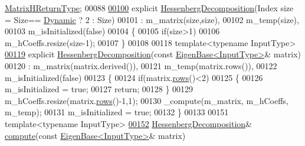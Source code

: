 \begin{DoxyCode}
       \hyperlink{group___eigenvalues___module_struct_eigen_1_1internal_1_1_hessenberg_decomposition_matrix_h_return_type}{MatrixHReturnType};
00088 
\hyperlink{group___eigenvalues___module_aee1724cb6418ede1a8b9045036a5a319}{00100}     \textcolor{keyword}{explicit} \hyperlink{group___eigenvalues___module_aee1724cb6418ede1a8b9045036a5a319}{HessenbergDecomposition}(Index size = Size==
      \hyperlink{namespace_eigen_ad81fa7195215a0ce30017dfac309f0b2}{Dynamic} ? 2 : Size)
00101       : m\_matrix(size,size),
00102         m\_temp(size),
00103         m\_isInitialized(false)
00104     \{
00105       \textcolor{keywordflow}{if}(size>1)
00106         m\_hCoeffs.resize(size-1);
00107     \}
00108 
00118     \textcolor{keyword}{template}<\textcolor{keyword}{typename} InputType>
\hyperlink{group___eigenvalues___module_acd22602a3e3e5a02f79990ba1e445dc9}{00119}     \textcolor{keyword}{explicit} \hyperlink{group___eigenvalues___module_acd22602a3e3e5a02f79990ba1e445dc9}{HessenbergDecomposition}(\textcolor{keyword}{const} 
      \hyperlink{group___core___module_struct_eigen_1_1_eigen_base}{EigenBase<InputType>}& matrix)
00120       : m\_matrix(matrix.derived()),
00121         m\_temp(matrix.rows()),
00122         m\_isInitialized(false)
00123     \{
00124       \textcolor{keywordflow}{if}(matrix.\hyperlink{group___core___module_a8141320ba8df384426c298b32b000d8e}{rows}()<2)
00125       \{
00126         m\_isInitialized = \textcolor{keyword}{true};
00127         \textcolor{keywordflow}{return};
00128       \}
00129       m\_hCoeffs.resize(matrix.\hyperlink{group___core___module_a8141320ba8df384426c298b32b000d8e}{rows}()-1,1);
00130       \_compute(m\_matrix, m\_hCoeffs, m\_temp);
00131       m\_isInitialized = \textcolor{keyword}{true};
00132     \}
00133 
00151     \textcolor{keyword}{template}<\textcolor{keyword}{typename} InputType>
\hyperlink{group___eigenvalues___module_a239a6fd42c57aab3c0b048c47fde3004}{00152}     \hyperlink{group___eigenvalues___module_class_eigen_1_1_hessenberg_decomposition}{HessenbergDecomposition}& \hyperlink{group___eigenvalues___module_a239a6fd42c57aab3c0b048c47fde3004}{compute}(\textcolor{keyword}{const} 
      \hyperlink{group___core___module_struct_eigen_1_1_eigen_base}{EigenBase<InputType>}& matrix)

\end{DoxyCode}

